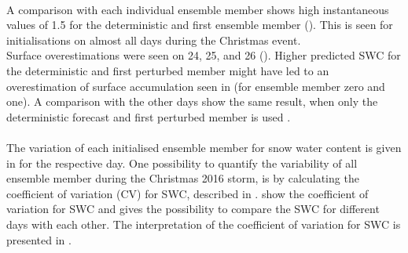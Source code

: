 \\
A comparison with each individual ensemble member shows high instantaneous values of \SI{1.5}{\SWC} for the deterministic and first ensemble member (). This is seen for initialisations on almost all days during the Christmas event. 
\\
Surface overestimations were seen on \num{24}, \num{25}, and \SI{26}{\dec} (). Higher predicted SWC for the deterministic and first perturbed member might have led to an overestimation of surface accumulation seen in  (for ensemble member zero and one).
% 
A comparison with the other days show the same result, when only the deterministic forecast and first perturbed member is used . 
\\
\\
The variation of each initialised ensemble member for snow water content is given in  for the respective day. %
One possibility to quantify the variability of all ensemble member during the Christmas 2016 storm, is by calculating the coefficient of variation (CV) for SWC, described in . 
 show the coefficient of variation for SWC and gives the possibility to compare the SWC for different days with each other. The interpretation of the coefficient of variation for SWC is presented in .
